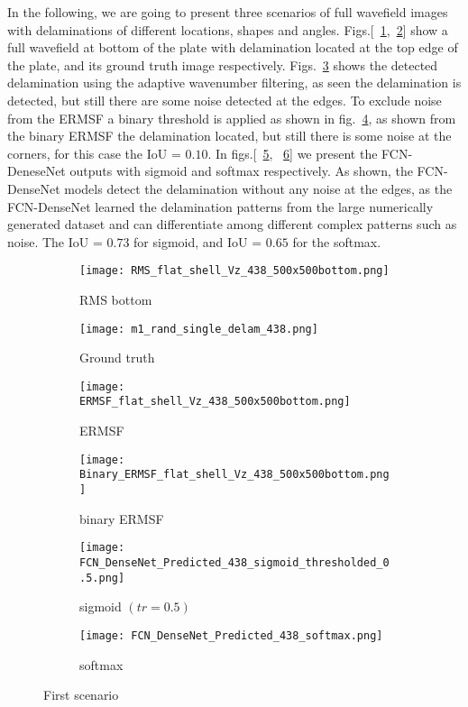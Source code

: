 	In the following, we are going to present three scenarios of full wavefield images with delaminations of different locations, shapes and angles.
	Figs.[~\ref{fig:RMS_flat_shell_Vz_438},~\ref{fig:m1_rand_single_delam_438}] show a full wavefield at bottom of the plate with delamination located at the top edge of the plate, and its ground truth image respectively. 
	Figs.~\ref{fig:ERMSF_flat_shell_Vz_438} shows the detected delamination using the adaptive wavenumber filtering, as seen the delamination is detected, but still there are some noise detected at the edges. 
	To exclude noise from the ERMSF a binary threshold is applied as shown in fig.~\ref{fig:Binary_ERMSF_flat_shell_Vz_438}, as shown from the binary ERMSF the delamination located, but still there is some noise at the corners, for this case the IoU = \(0.10\).
	In figs.[~\ref{fig:predict_438_sigmoid_tr_0.5}, ~\ref{fig:predict_438_softmax}] we present the FCN-DeneseNet outputs with sigmoid and softmax respectively.
	As shown, the FCN-DenseNet models detect the delamination without any noise at the edges, as the FCN-DenseNet learned the delamination patterns from the large numerically generated dataset and can differentiate among different complex patterns such as noise.   
	The IoU = \(0.73\) for sigmoid, and IoU = \(0.65\) for the softmax.
	\begin{figure} [!h]
		\centering
		\begin{subfigure}[b]{0.47\textwidth}
			\centering
			\texttt{[image: RMS\_flat\_shell\_Vz\_438\_500x500bottom.png]}
			\caption{RMS bottom}
			\label{fig:RMS_flat_shell_Vz_438}
		\end{subfigure}
		\hfill
			\begin{subfigure}[b]{0.47\textwidth}
			\centering
			\texttt{[image: m1\_rand\_single\_delam\_438.png]}
			\caption{Ground truth}
			\label{fig:m1_rand_single_delam_438}
		\end{subfigure}
		\hfill
		\begin{subfigure}[b]{0.47\textwidth}
			\centering
			\texttt{[image: ERMSF\_flat\_shell\_Vz\_438\_500x500bottom.png]}
			\caption{ERMSF}
			\label{fig:ERMSF_flat_shell_Vz_438}
		\end{subfigure}
		\hfill
		\begin{subfigure}[b]{0.47\textwidth}
			\centering
			\texttt{[image: Binary\_ERMSF\_flat\_shell\_Vz\_438\_500x500bottom.png]}
			\caption{binary ERMSF}
			\label{fig:Binary_ERMSF_flat_shell_Vz_438}
		\end{subfigure}
		\hfill
		\begin{subfigure}[b]{0.47\textwidth}
			\centering
		\texttt{[image: FCN\_DenseNet\_Predicted\_438\_sigmoid\_thresholded\_0.5.png]}
		\caption{sigmoid \((tr = 0.5)\)}
		\label{fig:predict_438_sigmoid_tr_0.5}
		\end{subfigure}
		\hfill
		\begin{subfigure}[b]{0.47\textwidth}
			\centering
			\texttt{[image: FCN\_DenseNet\_Predicted\_438\_softmax.png]}
			\caption{softmax}
			\label{fig:predict_438_softmax}
		\end{subfigure}
		\caption{First scenario}
		\label{fig:RMS438}
	\end{figure} 
